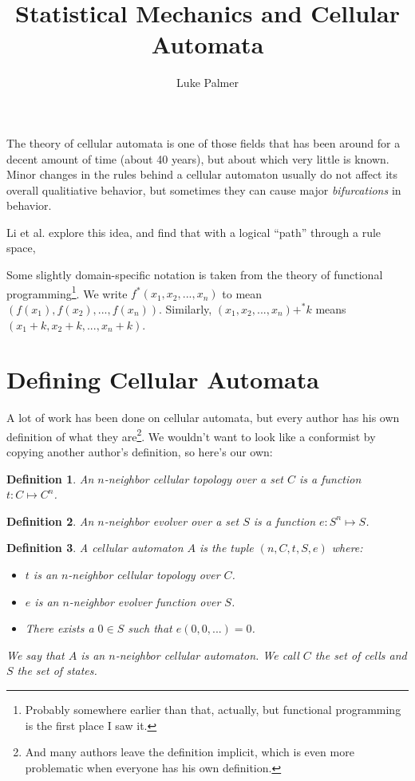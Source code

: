 \documentclass[12pt]{article}
\title{Statistical Mechanics and Cellular Automata}
\author{Luke Palmer}
\newtheorem*{Definition}{Definition}
\begin{document}
\maketitle

The theory of cellular automata is one of those fields that has been
around for a decent amount of time (about 40 years), but about which
very little is known.  Minor changes in the rules behind a cellular
automaton usually do not affect its overall qualitiative behavior, but
sometimes they can cause major \textit{bifurcations} in behavior.

Li et al. \cite{Li-1990} explore this idea, and find that with a logical
``path'' through a rule space, 

Some slightly domain-specific notation is taken from the theory of
functional programming\footnote{Probably somewhere earlier than that,
actually, but functional programming is the first place I saw it.}.  We
write $f^*(x_1, x_2, ..., x_n)$ to mean $(f(x_1), f(x_2), ..., f(x_n))$.
Similarly, $(x_1, x_2, ..., x_n) +^* k$ means $(x_1 + k, x_2 + k, ...,
x_n + k)$.

\section{Defining Cellular Automata}

A lot of work has been done on cellular automata, but every author has
his own definition of what they are\footnote{And many authors leave the
definition implicit, which is even more problematic when everyone has
his own definition.}.  We wouldn't want to look like a conformist by
copying another author's definition, so here's our own:

\begin{Definition}
An $n$-neighbor cellular topology over a set $C$ is a function $t: C
\mapsto C^n$.  
\end{Definition}

\begin{Definition}
An $n$-neighbor evolver over a set $S$ is a function $e: S^n \mapsto S$.
\end{Definition}

\begin{Definition}
A cellular automaton $A$ is the tuple $(n,C,t,S,e)$ where:
\begin{itemize}
\item $t$ is an $n$-neighbor cellular topology over $C$.
\item $e$ is an $n$-neighbor evolver function over $S$.
\item There exists a $0 \in S$ such that $e(0,0,...) = 0$.
\end{itemize}
We say that $A$ is an $n$-neighbor cellular automaton.  We call $C$ the
set of cells and $S$ the set of states.
\end{Definition}
\end{document}

